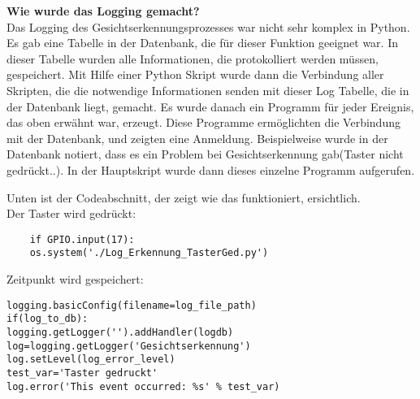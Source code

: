 \textbf{Wie wurde das Logging gemacht?}\\
Das Logging des Gesichtserkennungsprozesses war nicht sehr komplex in Python. Es gab eine Tabelle in der Datenbank, die für dieser Funktion geeignet war. In dieser Tabelle wurden alle Informationen, die protokolliert werden müssen, gespeichert. Mit Hilfe einer Python Skript wurde dann die Verbindung aller Skripten, die die notwendige Informationen senden mit dieser Log Tabelle, die in der Datenbank liegt, gemacht. Es wurde danach ein Programm für jeder Ereignis, das oben erwähnt war, erzeugt. Diese Programme ermöglichten die Verbindung mit der Datenbank, und zeigten eine Anmeldung. Beispielweise wurde in der Datenbank notiert, dass es ein Problem bei Gesichtserkennung gab(Taster nicht gedrückt..). In der Hauptskript wurde dann dieses einzelne Programm aufgerufen.

Unten ist der Codeabschnitt, der zeigt wie das funktioniert, ersichtlich.\\

Der Taster wird gedrückt: \\

\begin{lstlisting}
	if GPIO.input(17):
	os.system('./Log_Erkennung_TasterGed.py')
\end{lstlisting}

Zeitpunkt wird gespeichert: \\

\begin{lstlisting}
logging.basicConfig(filename=log_file_path)
if(log_to_db):
logging.getLogger('').addHandler(logdb)
log=logging.getLogger('Gesichtserkennung')
log.setLevel(log_error_level)
test_var='Taster gedruckt'
log.error('This event occurred: %s' % test_var)
\end{lstlisting}

